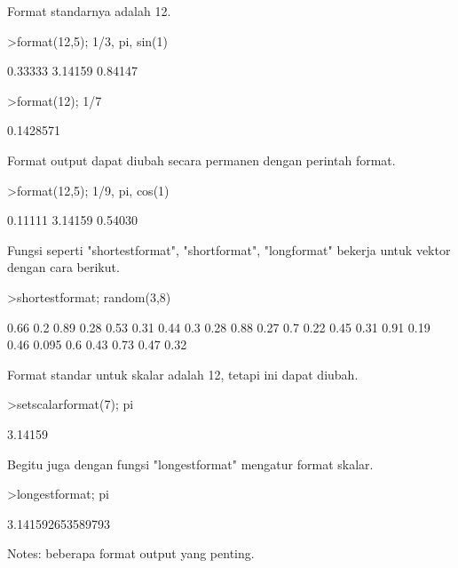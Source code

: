 \documentclass[a4paper,10pt]{article}
\begin{document}
\begin{eulernotebook}
\begin{eulercomment}
\begin{eulercomment}
\begin{eulercomment}
Format standarnya adalah 12.

\end{eulercomment}
\begin{eulerprompt}
>format(12,5); 1/3, pi, sin(1)
\end{eulerprompt}
\begin{euleroutput}
      0.33333 
      3.14159 
      0.84147 
\end{euleroutput}
\begin{eulerprompt}
>format(12); 1/7
\end{eulerprompt}
\begin{euleroutput}
  0.1428571
\end{euleroutput}
\begin{eulercomment}
Format output dapat diubah secara permanen dengan perintah format.
\end{eulercomment}
\begin{eulerprompt}
>format(12,5); 1/9, pi, cos(1)
\end{eulerprompt}
\begin{euleroutput}
      0.11111 
      3.14159 
      0.54030 
\end{euleroutput}
\begin{eulercomment}
Fungsi seperti "shortestformat", "shortformat", "longformat" bekerja
untuk vektor dengan cara berikut.
\end{eulercomment}
\begin{eulerprompt}
>shortestformat; random(3,8)
\end{eulerprompt}
\begin{euleroutput}
    0.66    0.2   0.89   0.28   0.53   0.31   0.44    0.3 
    0.28   0.88   0.27    0.7   0.22   0.45   0.31   0.91 
    0.19   0.46  0.095    0.6   0.43   0.73   0.47   0.32 
\end{euleroutput}
\begin{eulercomment}
Format standar untuk skalar adalah 12, tetapi ini dapat diubah.
\end{eulercomment}
\begin{eulerprompt}
>setscalarformat(7); pi
\end{eulerprompt}
\begin{euleroutput}
      3.14159 
\end{euleroutput}
\begin{eulercomment}
Begitu juga dengan fungsi "longestformat" mengatur format skalar.
\end{eulercomment}
\begin{eulerprompt}
>longestformat; pi
\end{eulerprompt}
\begin{euleroutput}
  3.141592653589793
\end{euleroutput}
\begin{eulercomment}
Notes: beberapa format output yang penting.


\end{eulercomment}
\end{eulercomment}
\end{eulercomment}
\end{eulernotebook}
\end{document}
